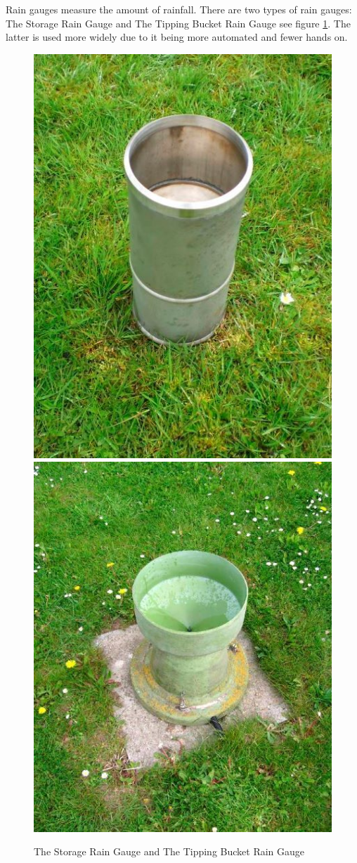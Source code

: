 Rain gauges measure the amount of rainfall. There are two types of rain gauges: The Storage Rain Gauge and The Tipping Bucket Rain Gauge see figure \ref{Gauge}. The latter is used more widely due to it being more automated and fewer hands on.\cite{RainGauge}

\begin{figure}[h]
\centering
\includegraphics[scale=0.2]{img/storageRainGauge.jpg}
\includegraphics[scale=0.2]{img/tippingBucketGauge.jpg}
\caption{The Storage Rain Gauge and The Tipping Bucket Rain Gauge}
\label{Gauge}
\end{figure}

